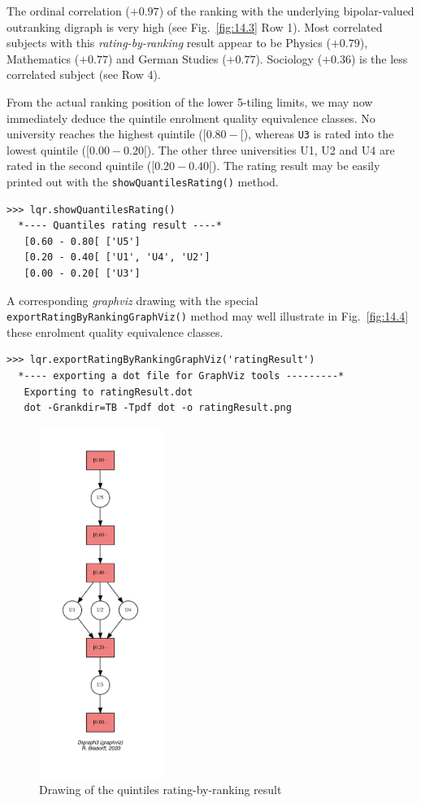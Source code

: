 The ordinal correlation ($+0.97$) of the \Copeland ranking with the underlying bipolar-valued outranking digraph is very high (see Fig.~\vref{fig:14.3} Row 1). Most correlated subjects with this \emph{rating-by-ranking} result appear to be Physics ($+0.79$), Mathematics ($+0.77$) and German Studies ($+0.77$). Sociology ($+0.36$) is the less correlated subject (see Row 4).

From the actual ranking position of the lower 5-tiling limits, we may now immediately deduce the quintile enrolment quality equivalence classes. No university reaches the highest quintile ($[0.80 - [$), whereas \texttt{U3} is rated into the lowest quintile ($[0.00- 0.20[$). The other three universities U1, U2 and U4 are rated in the second quintile ($[0.20- 0.40[$). The rating result may be easily printed out with the \texttt{showQuantilesRating()} method.
\begin{lstlisting}[caption={Showing the quintiling of the enrolment quality of the 5 Universities},label=list:14.3]
>>> lqr.showQuantilesRating()
  *---- Quantiles rating result ----*
   [0.60 - 0.80[ ['U5']
   [0.20 - 0.40[ ['U1', 'U4', 'U2']
   [0.00 - 0.20[ ['U3']
\end{lstlisting}

A corresponding \emph{graphviz} drawing with the special \texttt{exportRatingByRan\-kingGraphViz()} method may well illustrate in Fig.~\vref{fig:14.4} these enrolment quality equivalence classes.
\begin{lstlisting}
>>> lqr.exportRatingByRankingGraphViz('ratingResult')
  *---- exporting a dot file for GraphViz tools ---------*
   Exporting to ratingResult.dot
   dot -Grankdir=TB -Tpdf dot -o ratingResult.png
\end{lstlisting}
\begin{figure}[ht]
\sidecaption[t]
\includegraphics[width=4cm]{Figures/14-4-ratingResult.pdf}
\caption{Drawing of the quintiles rating-by-ranking result}
\label{fig:14.4}       %
\end{figure}

